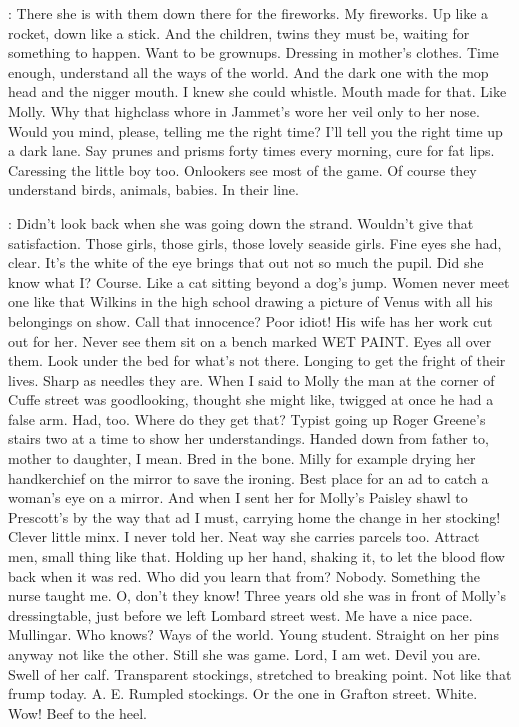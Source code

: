 \Bloom:
There she is with them down there for the fireworks. My fireworks.
Up like a rocket, down like a stick. And the children, twins they must be,
waiting for something to happen. Want to be grownups. Dressing in
mother's clothes. Time enough, understand all the ways of the world. And
the dark one with the mop head and the nigger mouth. I knew she could
whistle. Mouth made for that. Like Molly. Why that highclass whore in
Jammet's wore her veil only to her nose. Would you mind, please, telling
me the right time? I'll tell you the right time up a dark lane. Say prunes
and prisms forty times every morning, cure for fat lips. Caressing the
little boy too. Onlookers see most of the game. Of course they understand
birds, animals, babies. In their line.

\Bloom:
Didn't look back when she was going down the strand. Wouldn't give that
satisfaction. Those girls, those girls, those lovely seaside girls. Fine
eyes she had, clear. It's the white of the eye brings that out not so much
the pupil. Did she know what I? Course. Like a cat sitting beyond a dog's
jump. Women never meet one like that Wilkins in the high school drawing a
picture of Venus with all his belongings on show. Call that innocence?
Poor idiot! His wife has her work cut out for her. Never see them sit
on a bench marked WET PAINT. Eyes all over them. Look under the bed
for what's not there. Longing to get the fright of their lives.
Sharp as needles they are. When I said to Molly the man at the corner
of Cuffe street was goodlooking, thought she might like, twigged at
once he had a false arm. Had, too. Where do they get that? Typist
going up Roger Greene's stairs two at a time to show her understandings.
Handed down from father to, mother to daughter, I mean. Bred in the
bone. Milly for example drying her handkerchief on the mirror to
save the ironing. Best place for an ad to catch a woman's eye on a
mirror. And when I sent her for Molly's Paisley shawl to Prescott's
by the way that ad I must, carrying home the change in her stocking!
Clever little minx. I never told her. Neat way she carries parcels
too. Attract men, small thing like that. Holding up her hand, shaking it,
to let the blood flow back when it was red. Who did you learn that from?
Nobody. Something the nurse taught me. O, don't they know! Three years
old she was in front of Molly's dressingtable, just before we left Lombard
street west. Me have a nice pace. Mullingar. Who knows? Ways of the
world. Young student. Straight on her pins anyway not like the other.
Still she was game. Lord, I am wet. Devil you are. Swell of her calf.
Transparent stockings, stretched to breaking point. Not like that frump
today. A. E. Rumpled stockings. Or the one in Grafton street. White. Wow!
Beef to the heel.

